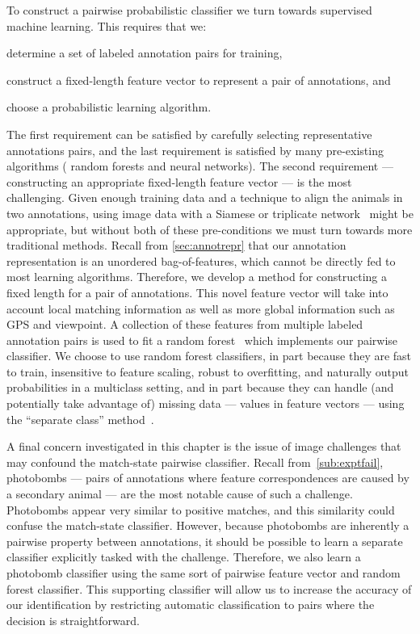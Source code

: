 \MatchStateExample{}

To construct a pairwise probabilistic classifier we turn towards supervised machine learning.
This requires that we:
\begin{enumin}
    \item determine a set of labeled annotation pairs for training,

    \item construct a fixed-length feature vector to represent a pair of annotations,  and

    \item choose a probabilistic learning algorithm.
\end{enumin}
The first requirement can be satisfied by carefully selecting representative annotations pairs, and the last
  requirement is satisfied by many pre-existing algorithms (\eg{} random forests and neural networks).
The second requirement --- constructing an appropriate fixed-length feature vector --- is the most challenging.
Given enough training data and a technique to align the animals in two annotations, using image data with a
  Siamese or triplicate network~\cite{taigman_deepface_2014,schroff_facenet_2015} might be appropriate, but without
  both of these pre-conditions we must turn towards more traditional methods.
Recall from \cref{sec:annotrepr} that our annotation representation is an unordered bag-of-features, which cannot
  be directly fed to most learning algorithms.
Therefore, we develop a method for constructing a fixed length  for a pair of
  annotations.
This novel feature vector will take into account local matching information as well as more global information
  such as GPS and viewpoint.
A collection of these features from multiple labeled annotation pairs is used to fit a random
  forest~\cite{breiman_random_2001} which implements our pairwise classifier.
We choose to use random forest classifiers, in part because they are fast to train, insensitive to feature
  scaling, robust to overfitting, and naturally output probabilities in a multiclass setting, and in part because
  they can handle (and potentially take advantage of) missing data --- \ie{} \nan{} values in feature vectors ---
  using the ``separate class'' method~\cite{ding_investigation_2010}.
  

A final concern investigated in this chapter is the issue of image challenges that may confound the match-state
  pairwise classifier.
Recall from~\cref{sub:exptfail}, {photobombs} --- pairs of annotations where feature correspondences are caused
  by a secondary animal --- are the most notable cause of such a challenge.
Photobombs appear very similar to positive matches, and this similarity could confuse the match-state classifier.
However, because photobombs are inherently a pairwise property between annotations, it should be possible to
  learn a separate classifier explicitly tasked with the challenge.
Therefore, we also learn a photobomb classifier using the same sort of pairwise feature vector and random forest
  classifier.
This supporting classifier will allow us to increase the accuracy of our identification by restricting automatic
  classification to pairs where the decision is straightforward.


